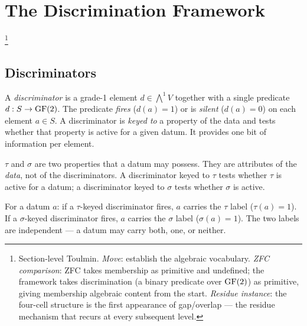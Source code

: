 \section{The Discrimination Framework}\label{sec:framework}\footnote{Section-level Toulmin. \emph{Move}: establish the algebraic vocabulary. \emph{ZFC comparison}: ZFC takes membership as primitive and undefined; the framework takes discrimination (a binary predicate over $\operatorname{GF}(2)$) as primitive, giving membership algebraic content from the start. \emph{Residue instance}: the four-cell structure is the first appearance of gap/overlap --- the residue mechanism that recurs at every subsequent level.}

\subsection{Discriminators}

\begin{definition}[Discriminator]\label{def:discriminator}
A \emph{discriminator} is a grade-1 element $d \in \bigwedge^1 V$
together with a single predicate $d: S \to \operatorname{GF}(2)$. The
predicate \emph{fires} ($d(a) = 1$) or is \emph{silent}
($d(a) = 0$) on each element $a \in S$. A discriminator
is \emph{keyed to} a property of the data and tests whether
that property is active for a given datum. It provides one
bit of information per element.
\end{definition}

\begin{definition}
\label{def:tau-sigma}
$\tau$ and $\sigma$ are two properties that a datum may
possess. They are attributes of the \emph{data}, not of
the discriminators. A discriminator keyed to $\tau$ tests
whether $\tau$ is active for a datum; a discriminator
keyed to $\sigma$ tests whether $\sigma$ is active.

For a datum $a$: if a $\tau$-keyed discriminator fires,
$a$ carries the $\tau$ label ($\tau(a) = 1$). If a
$\sigma$-keyed discriminator fires, $a$ carries the
$\sigma$ label ($\sigma(a) = 1$). The two labels are
independent --- a datum may carry both, one, or neither.
\end{definition}

